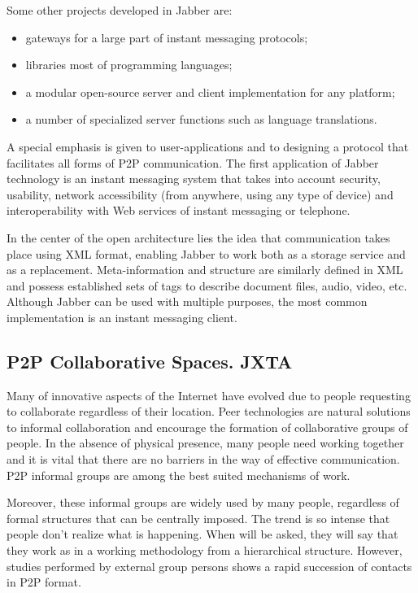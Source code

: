 Some other projects developed in Jabber are:
\begin{itemize}
  \item gateways for a large part of instant messaging protocols;
  \item libraries most of programming languages;
  \item a modular open-source server and client implementation for any platform;
  \item a number of specialized server functions such as language translations.
\end{itemize}

A special emphasis is given to user-applications and to designing a protocol
that facilitates all forms of P2P communication. The first application of Jabber
technology is an instant messaging system that takes into account security,
usability, network accessibility (from anywhere, using any type of device) and
interoperability with Web services of instant messaging or telephone.

In the center of the open architecture lies the idea that communication takes
place using XML format, enabling Jabber to work both as a storage service and
as a replacement. Meta-information and structure are similarly defined in XML
and possess established sets of tags to describe document files, audio, video,
etc. Although Jabber can be used with multiple purposes, the most common
implementation is an instant messaging client.

\subsection{P2P Collaborative Spaces. JXTA}

Many of innovative aspects of the Internet have evolved due to people
requesting to collaborate regardless of their location. Peer
technologies are natural solutions to informal collaboration and encourage
the formation of collaborative groups of people. In the absence of physical
presence, many people need working together and it is vital that there are no
barriers in the way of effective communication. P2P informal groups are among
the best suited mechanisms of work.

Moreover, these informal groups are widely used by many people, regardless of
formal structures that can be centrally imposed. The trend is so intense that
people don't realize what is happening. When will be asked, they will say that
they work as in a working methodology from a hierarchical structure. However,
studies performed by external group persons shows a rapid succession of
contacts in P2P format.

